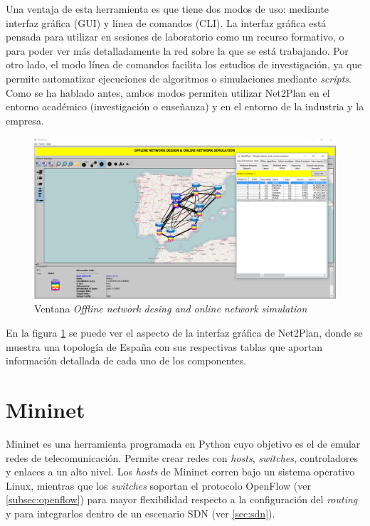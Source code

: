 Una ventaja de esta herramienta es que tiene dos modos de uso: mediante interfaz gráfica (\ac{GUI}) y línea de comandos (\ac{CLI}). La interfaz gráfica está pensada para utilizar en sesiones de laboratorio como un recurso formativo, o para poder ver más detalladamente la red sobre la que se está trabajando. Por otro lado, el modo línea de comandos facilita los estudios de investigación, ya que permite automatizar ejecuciones de algoritmos o simulaciones mediante \textit{scripts}. Como se ha hablado antes, ambos modos permiten utilizar Net2Plan en el entorno académico (investigación o enseñanza) y en el entorno de la industria y la empresa.

\begin{figure}[ht!]
	\centering
	\includegraphics[width=1\linewidth]{imagenes/n2p_redes}
	\caption{Ventana \textit{Offline network desing and online network simulation}}
	\label{fig:n2p_redes}
\end{figure}

En la figura \ref{fig:n2p_redes} se puede ver el aspecto de la interfaz gráfica de Net2Plan, donde se muestra una topología de España con sus respectivas tablas que aportan información detallada de cada uno de los componentes.

\section{Mininet}
\label{sec:mininet}

Mininet\cite{mininetbib} es una herramienta programada en Python cuyo objetivo es el de emular redes de telecomunicación. Permite crear redes con \textit{hosts}, \textit{switches}, controladores y enlaces a un alto nivel. Los \textit{hosts} de Mininet corren bajo un sistema operativo Linux, mientras que los \textit{switches} soportan el protocolo OpenFlow (ver \ref{subsec:openflow}) para mayor flexibilidad respecto a la configuración del \textit{routing} y para integrarlos dentro de un escenario \ac{SDN} (ver \ref{sec:sdn}).

